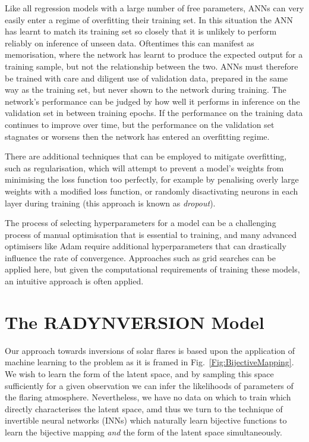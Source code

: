 Like all regression models with a large number of free parameters, ANNs can very easily enter a regime of overfitting their training set.
In this situation the ANN has learnt to match its training set so closely that it is unlikely to perform reliably on inference of unseen data.
Oftentimes this can manifest as memorisation, where the network has learnt to produce the expected output for a training sample, but not the relationship between the two.
ANNs must therefore be trained with care and diligent use of validation data, prepared in the same way as the training set, but never shown to the network during training.
The network's performance can be judged by how well it performs in inference on the validation set in between training epochs.
If the performance on the training data continues to improve over time, but the performance on the validation set stagnates or worsens then the network has entered an overfitting regime.

There are additional techniques that can be employed to mitigate overfitting, such as regularisation, which will attempt to prevent a model's weights from minimising the loss function too perfectly, for example by penalising overly large weights with a modified loss function, or randomly disactivating neurons in each layer during training (this approach is known as \emph{dropout}).

The process of selecting hyperparameters for a model can be a challenging process of manual optimisation that is essential to training, and many advanced optimisers like Adam require additional hyperparameters that can drastically influence the rate of convergence.
Approaches such as grid searches can be applied here, but given the computational requirements of training these models, an intuitive approach is often applied.

\section{The RADYNVERSION Model}

Our approach towards inversions of solar flares is based upon the application of machine learning to the problem as it is framed in Fig.~\ref{Fig:BijectiveMapping}.
We wish to learn the form of the latent space, and by sampling this space sufficiently for a given observation we can infer the likelihoods of parameters of the flaring atmosphere.
Nevertheless, we have no data on which to train which directly characterises the latent space, amd thus we turn to the technique of invertible neural networks (INNs) which naturally learn bijective functions to learn the bijective mapping \emph{and} the form of the latent space simultaneously.

